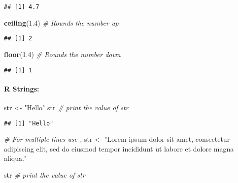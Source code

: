 \documentclass[
]{article}
\newenvironment{Shaded}{\begin{snugshade}}{\end{snugshade}}
\newcommand{\CommentTok}[1]{\textcolor[rgb]{0.56,0.35,0.01}{\textit{#1}}}
\newcommand{\FloatTok}[1]{\textcolor[rgb]{0.00,0.00,0.81}{#1}}
\newcommand{\FunctionTok}[1]{\textcolor[rgb]{0.13,0.29,0.53}{\textbf{#1}}}
\newcommand{\NormalTok}[1]{#1}
\newcommand{\OtherTok}[1]{\textcolor[rgb]{0.56,0.35,0.01}{#1}}
\newcommand{\StringTok}[1]{\textcolor[rgb]{0.31,0.60,0.02}{#1}}
\begin{document}
\begin{verbatim}
## [1] 4.7
\end{verbatim}

\begin{Shaded}
\begin{Highlighting}[]
\FunctionTok{ceiling}\NormalTok{(}\FloatTok{1.4}\NormalTok{) }\CommentTok{\# Rounds the number up}
\end{Highlighting}
\end{Shaded}

\begin{verbatim}
## [1] 2
\end{verbatim}

\begin{Shaded}
\begin{Highlighting}[]
\FunctionTok{floor}\NormalTok{(}\FloatTok{1.4}\NormalTok{) }\CommentTok{\# Rounds the number down}
\end{Highlighting}
\end{Shaded}

\begin{verbatim}
## [1] 1
\end{verbatim}

\hypertarget{r-strings}{%
\paragraph{R Strings:}\label{r-strings}}

\begin{Shaded}
\begin{Highlighting}[]
\NormalTok{str }\OtherTok{\textless{}{-}} \StringTok{"Hello"}
\NormalTok{str }\CommentTok{\# print the value of str}
\end{Highlighting}
\end{Shaded}

\begin{verbatim}
## [1] "Hello"
\end{verbatim}

\begin{Shaded}
\begin{Highlighting}[]
\CommentTok{\# For multiple lines use ,}
\NormalTok{str }\OtherTok{\textless{}{-}} \StringTok{"Lorem ipsum dolor sit amet,}
\StringTok{consectetur adipiscing elit,}
\StringTok{sed do eiusmod tempor incididunt}
\StringTok{ut labore et dolore magna aliqua."}

\NormalTok{str }\CommentTok{\# print the value of str}
\end{Highlighting}
\end{Shaded}
\end{document}
